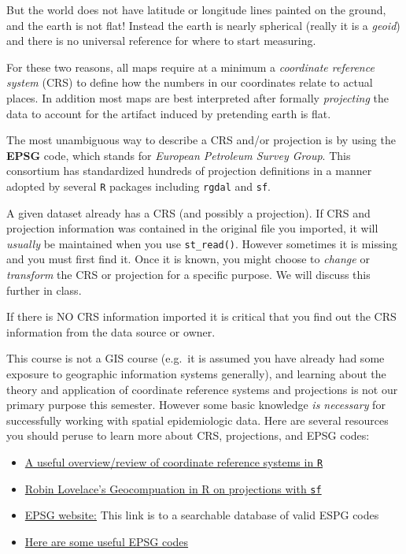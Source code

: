 \documentclass[
]{book}
\providecommand{\tightlist}{%
  \setlength{\itemsep}{0pt}\setlength{\parskip}{0pt}}
\newenvironment{rmdcaution}[1]
  {
  \begin{itemize}
  \renewcommand{\labelitemi}{
    \raisebox{-.7\height}[0pt][0pt]{
      {\setkeys{Gin}{width=3em,keepaspectratio}\texttt{[image: images/\#1]}}
    }
  }
  \setlength{\fboxsep}{1em}
  \begin{caution}
  \item
  }
  {
  \end{caution}
  \end{itemize}
  }
\begin{document}
But the world does not have latitude or longitude lines painted on the ground, and the earth is not flat! Instead the earth is nearly spherical (really it is a \emph{geoid}) and there is no universal reference for where to start measuring.

For these two reasons, all maps require at a minimum a \emph{coordinate reference system} (CRS) to define how the numbers in our coordinates relate to actual places. In addition most maps are best interpreted after formally \emph{projecting} the data to account for the artifact induced by pretending earth is flat.

The most unambiguous way to describe a CRS and/or projection is by using the \textbf{EPSG} code, which stands for \emph{European Petroleum Survey Group}. This consortium has standardized hundreds of projection definitions in a manner adopted by several \texttt{R} packages including \texttt{rgdal} and \texttt{sf}.

A given dataset already has a CRS (and possibly a projection). If CRS and projection information was contained in the original file you imported, it will \emph{usually} be maintained when you use \texttt{st\_read()}. However sometimes it is missing and you must first find it. Once it is known, you might choose to \emph{change} or \emph{transform} the CRS or projection for a specific purpose. We will discuss this further in class.

\begin{rmdcaution}{caution}
If there is NO CRS information imported it is critical that you find out the CRS information from the data source or owner.

\end{rmdcaution}

This course is not a GIS course (e.g.~it is assumed you have already had some exposure to geographic information systems generally), and learning about the theory and application of coordinate reference systems and projections is not our primary purpose this semester. However some basic knowledge \emph{is necessary} for successfully working with spatial epidemiologic data. Here are several resources you should peruse to learn more about CRS, projections, and EPSG codes:

\begin{itemize}
\tightlist
\item
  \href{https://www.nceas.ucsb.edu/sites/default/files/2020-04/OverviewCoordinateReferenceSystems.pdf}{A useful overview/review of coordinate reference systems in \texttt{R}}
\item
  \href{https://geocompr.robinlovelace.net/reproj-geo-data.html}{Robin Lovelace's Geocompuation in R on projections with \texttt{sf}}
\item
  \href{https://epsg.io/}{EPSG website:} This link is to a searchable database of valid ESPG codes
\item
  \href{https://guides.library.duke.edu/r-geospatial/CRS}{Here are some useful EPSG codes}
\end{itemize}
\end{document}

